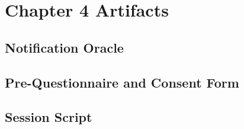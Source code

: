 \chapter{Chapter 4 Artifacts}\label{chap4:artifacts}

\begin{appendices}
    
    \section{Notification Oracle}
    
    
    
    \section{Pre-Questionnaire and Consent Form}
    
    
    
    \section{Session Script}
    
    
    
\end{appendices}